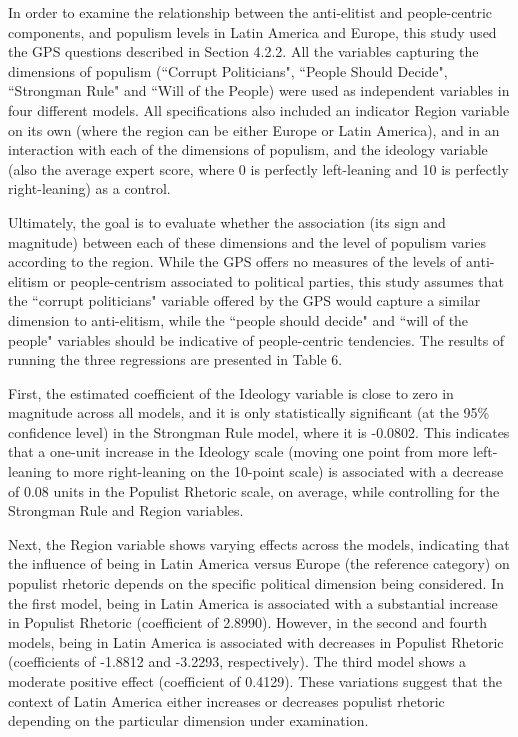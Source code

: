 \documentclass[12pt,letterpaper]{article}
\begin{document}
\vspace{.25cm}
\noindent In order to examine the relationship between the anti-elitist and people-centric components, and populism levels in Latin America and Europe, this study used the GPS questions described in Section 4.2.2. All the variables capturing the dimensions of populism (``Corrupt Politicians", ``People Should Decide", ``Strongman Rule" and ``Will of the People) were used as independent variables in four different models. All specifications also included an indicator Region variable on its own (where the region can be either Europe or Latin America), and in an interaction with each of the dimensions of populism, and the ideology variable (also the average expert score, where 0 is perfectly left-leaning and 10 is perfectly right-leaning) as a control. 

Ultimately, the goal is to evaluate whether the association (its sign and magnitude) between each of these dimensions and the level of populism varies according to the region. While the GPS offers no measures of the levels of anti-elitism or people-centrism associated to political parties, this study assumes that the ``corrupt politicians" variable offered by the GPS would capture a similar dimension to anti-elitism, while the ``people should decide" and ``will of the people" variables should be indicative of people-centric tendencies. The results of running the three regressions are presented in Table 6. 

First, the estimated coefficient of the Ideology variable is close to zero in magnitude across all models, and it is only statistically significant (at the 95\% confidence level) in the Strongman Rule model, where it is -0.0802. This indicates that a one-unit increase in the Ideology scale (moving one point from more left-leaning to more right-leaning on the 10-point scale) is associated with a decrease of 0.08 units in the Populist Rhetoric scale, on average, while controlling for the Strongman Rule and Region variables.

Next, the Region variable shows varying effects across the models, indicating that the influence of being in Latin America versus Europe (the reference category) on populist rhetoric depends on the specific political dimension being considered. In the first model, being in Latin America is associated with a substantial increase in Populist Rhetoric (coefficient of 2.8990). However, in the second and fourth models, being in Latin America is associated with decreases in Populist Rhetoric (coefficients of -1.8812 and -3.2293, respectively). The third model shows a moderate positive effect (coefficient of 0.4129). These variations suggest that the context of Latin America either increases or decreases populist rhetoric depending on the particular dimension under examination.
\end{document}
